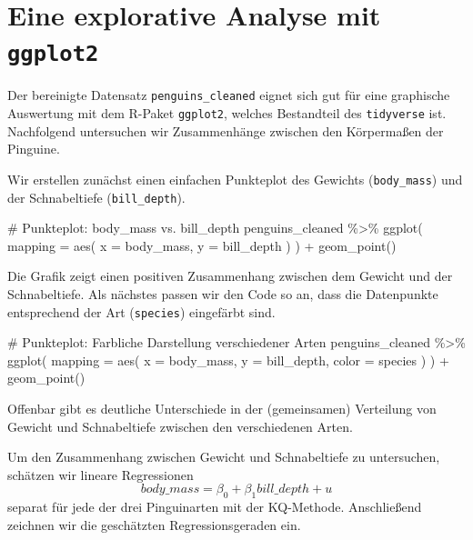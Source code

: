 \documentclass[
  a4paper,
  DIV=11,
  oneside]{scrreprt}
\newenvironment{Shaded}{\begin{snugshade}}{\end{snugshade}}
\newcommand{\NormalTok}[1]{\textcolor[rgb]{0.00,0.23,0.31}{#1}}
\begin{document}
\hypertarget{eine-explorative-analyse-mit-ggplot2}{%
\section{\texorpdfstring{Eine explorative Analyse mit
\texttt{ggplot2}}{Eine explorative Analyse mit ggplot2}}\label{eine-explorative-analyse-mit-ggplot2}}

Der bereinigte Datensatz \texttt{penguins\_cleaned} eignet sich gut für
eine graphische Auswertung mit dem R-Paket \texttt{ggplot2}, welches
Bestandteil des \texttt{tidyverse} ist. Nachfolgend untersuchen wir
Zusammenhänge zwischen den Körpermaßen der Pinguine.

Wir erstellen zunächst einen einfachen Punkteplot des Gewichts
(\texttt{body\_mass}) und der Schnabeltiefe (\texttt{bill\_depth}).

\begin{Shaded}
\begin{Highlighting}[]
\NormalTok{\# Punkteplot: body\_mass vs. bill\_depth}
\NormalTok{penguins\_cleaned \%\textgreater{}\%}
\NormalTok{  ggplot(}
\NormalTok{    mapping = aes(}
\NormalTok{      x = body\_mass, }
\NormalTok{      y = bill\_depth}
\NormalTok{    )}
\NormalTok{  ) +}
\NormalTok{  geom\_point()}
\end{Highlighting}
\end{Shaded}

Die Grafik zeigt einen positiven Zusammenhang zwischen dem Gewicht und
der Schnabeltiefe. Als nächstes passen wir den Code so an, dass die
Datenpunkte entsprechend der Art (\texttt{species}) eingefärbt sind.

\begin{Shaded}
\begin{Highlighting}[]
\NormalTok{\# Punkteplot: Farbliche Darstellung verschiedener Arten}
\NormalTok{penguins\_cleaned \%\textgreater{}\%}
\NormalTok{  ggplot(}
\NormalTok{    mapping = aes(}
\NormalTok{      x = body\_mass, }
\NormalTok{      y = bill\_depth, }
\NormalTok{      color = species}
\NormalTok{    )}
\NormalTok{  ) +}
\NormalTok{  geom\_point()}
\end{Highlighting}
\end{Shaded}

Offenbar gibt es deutliche Unterschiede in der (gemeinsamen) Verteilung
von Gewicht und Schnabeltiefe zwischen den verschiedenen Arten.

Um den Zusammenhang zwischen Gewicht und Schnabeltiefe zu untersuchen,
schätzen wir lineare Regressionen
\[body\_mass = \beta_0 + \beta_1 bill\_depth + u\] separat für jede der
drei Pinguinarten mit der KQ-Methode. Anschließend zeichnen wir die
geschätzten Regressionsgeraden ein.
\end{document}
